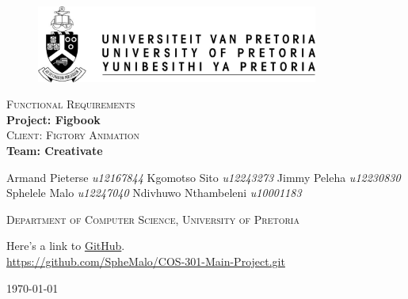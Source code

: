 


\begin{titlepage}
	\begin{center}
		
		\begin{figure}[t]
			\centering
			\includegraphics[width=350px]{images/up-logo.jpg}
		\end{figure}
		
		\textsc{\large Functional Requirements} \\ 
		\vspace{2cm}
		\textbf{\Huge Project: Figbook} \\ 
		\textsc{\large Client: Figtory Animation} \\ 
		\vspace{2cm}
		\textbf{\Huge Team: Creativate } \\ 
		
		\begin{flushright} \large
			Armand Pieterse \emph{u12167844} \newline
			Kgomotso Sito 		\emph{u12243273} \newline
			Jimmy Peleha		\emph{u12230830} \newline
			Sphelele Malo 	\emph{u12247040} \newline
			Ndivhuwo Nthambeleni 	\emph{u10001183} \newline
			\end{flushright}
		\textsc{\small Department of Computer Science, University of Pretoria}
		
		\vfill
		
	Here's a link to \href{https://github.com/SpheMalo/COS-301-Main-Project.git}{GitHub}.\\
	\url{https://github.com/SpheMalo/COS-301-Main-Project.git}

	\vfill

	{\large \today}	
	
		
		
	\end{center}
\end{titlepage}
